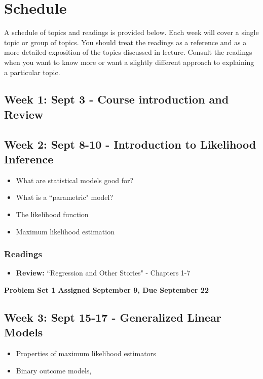 \documentclass[11pt, article, oneside]{memoir}
\theoremstyle{Assumption}
\begin{document}
\section*{Schedule}

A schedule of topics and readings is provided below. Each week will cover a single topic or group of topics. You should treat the readings as a reference and as a more detailed exposition of the topics discussed in lecture. Consult the readings when you want to know more or want a slightly different approach to explaining a particular topic.

\subsection{Week 1: Sept 3 - Course introduction and Review}

\subsection{Week 2: Sept 8-10 - Introduction to Likelihood Inference}

\begin{itemize}
  \item What are statistical models good for?
  \item What is a ``parametric" model?
  \item The likelihood function 
  \item Maximum likelihood estimation
\end{itemize}

\subsubsection*{Readings}

\begin{itemize}
\item \textbf{Review:} ``Regression and Other Stories" - Chapters 1-7
\end{itemize}

\textbf{Problem Set 1 Assigned September 9, Due September 22}

\subsection{Week 3: Sept 15-17 - Generalized Linear Models}

\begin{itemize}
\item Properties of maximum likelihood estimators
\item Binary outcome models,
\end{itemize}
\end{document}

